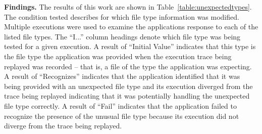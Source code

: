 {\bf Findings.}
The results of this work are shown in Table~\ref{table:unexpectedtypes}.  The
condition tested describes for which file type information was modified.
Multiple executions were used to examine the applications response to each of
the listed file types. The ``I...'' column headings denote which file
type was being tested for a given execution.  A result of ``Initial Value''
indicates that this type is the file type the application was provided when the
execution trace being replayed was recorded -- that is, a file of the type the
application was expecting.  A result of ``Recognizes'' indicates that the
application identified that it was being provided with an unexpected file type
and its execution diverged from the trace being replayed indicating that it was
potentially handling the unexpected file type correctly.  A result of ``Fail''
indicates that the application failed to recognize the presence of the unusual
file type because its execution did not diverge from the trace being replayed.


